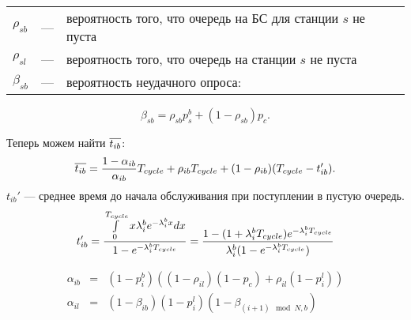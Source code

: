 \begin{tabular}{l l l}
$\rho_{sb}$ 	&---	&вероятность того, что очередь на БС для станции $s$ не пуста \\
$\rho_{sl}$		&---	&вероятность того, что очередь на станции $s$ не пуста  \\
$\beta_{sb}$	&---	&вероятность неудачного опроса:\\
\end{tabular}
\begin{equation}
\beta_{sb} = \rho_{sb} p^b_s + (1 - \rho_{sb})p_c.
\end{equation}

Теперь можем найти $\overline{t_{i b}}$:
\begin{equation}
\notag
\overline{t_{i b}} = \frac{1-\alpha_{ib}}{\alpha_{ib}} T_{cycle} + \rho_{ib} T_{cycle} + (1 - \rho_{ib}) (T_{cycle}-t_{ib}').
\end{equation}
$t_{ib}'$ --- среднее время до начала обслуживания при поступлении в пустую очередь.
\begin{equation}
t_{ib}' = \frac{\int\limits_{0}^{T_{cycle}} x\lambda^{b}_{i}e^{-\lambda^{b}_{i}x}dx}{1-e^{-\lambda^{b}_{i}T_{cycle}}} = \frac{1-(1+\lambda^{b}_{i}T_{cycle})e^{-\lambda^{b}_{i}T_{cycle}}}{\lambda^{b}_{i}(1-e^{-\lambda^{b}_{i}T_{cycle}})}
\end{equation}

\begin{eqnarray}
\alpha_{ib} & = & (1 - p_{i}^{b})((1-\rho_{il})(1-p_c)+\rho_{il}(1-p_{i}^l)) \\
\alpha_{il} & = & (1 - \beta_{ib})(1-p_i^l)(1-\beta_{{(i+1)\mod N},b}) \\
\end{eqnarray}

